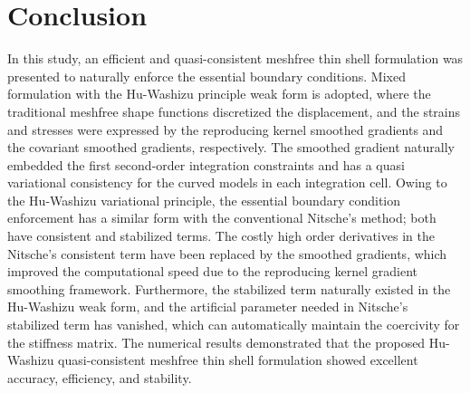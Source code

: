 \section{Conclusion}\label{conclusion}
In this study, an efficient and quasi-consistent meshfree thin shell formulation was presented to naturally enforce the essential boundary conditions.  Mixed formulation with the Hu-Washizu principle weak form is adopted, where the traditional meshfree shape functions discretized the displacement, and the strains and stresses were expressed by the reproducing kernel smoothed gradients and the covariant smoothed gradients, respectively. The smoothed gradient naturally embedded the first second-order integration constraints and has a quasi variational consistency for the curved models in each integration cell. Owing to the Hu-Washizu variational principle, the essential boundary condition enforcement has a similar form with the conventional Nitsche’s method; both have consistent and stabilized terms. The costly high order derivatives in the Nitsche’s consistent term have been replaced by the smoothed gradients, which improved the computational speed due to the reproducing kernel gradient smoothing framework. Furthermore, the stabilized term naturally existed in the Hu-Washizu weak form, and the artificial parameter needed in Nitsche’s stabilized term has vanished, which can automatically maintain the coercivity for the stiffness matrix. \DIFaddbegin {}\DIFaddend The numerical results demonstrated that the proposed Hu-Washizu quasi-consistent meshfree thin shell formulation showed excellent accuracy, efficiency, and stability.

